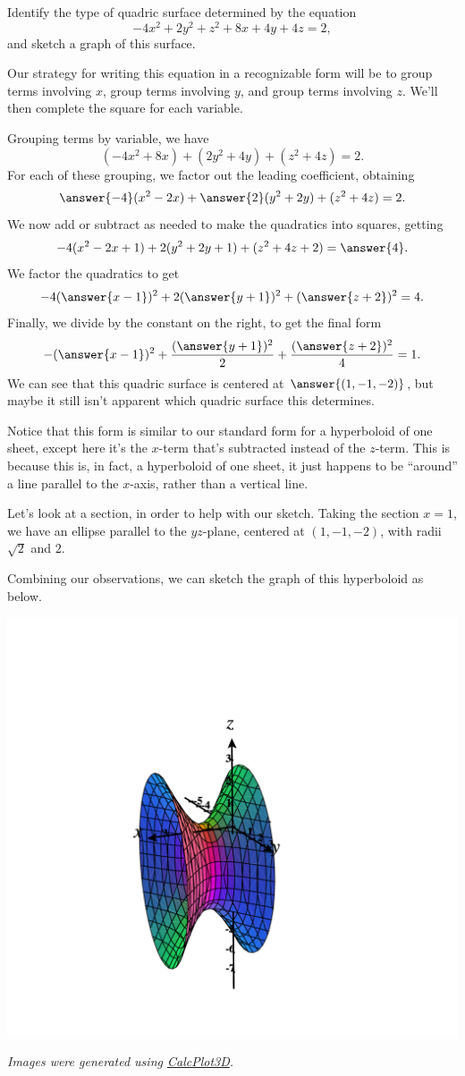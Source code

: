\documentclass{ximera}
\begin{document}
\begin{example}
Identify the type of quadric surface determined by the equation
\[
-4x^2 + 2y^2 + z^2 + 8x + 4y+4z = 2,
\]
and sketch a graph of this surface.

Our strategy for writing this equation in a recognizable form will be to group terms involving $x$, group terms involving $y$, and group terms involving $z$. We'll then complete the square for each variable.

Grouping terms by variable, we have
\[
(-4x^2+8x) + (2y^2 + 4y) + (z^2 + 4z) = 2.
\]
For each of these grouping, we factor out the leading coefficient, obtaining
\[
\answer{-4}(x^2-2x) + \answer{2}(y^2 + 2y) + (z^2 + 4z) = 2.
\]
We now add or subtract as needed to make the quadratics into squares, getting
\[
-4(x^2-2x + 1) + 2(y^2 + 2y + 1) + (z^2 + 4z + 2) = \answer{4}.
\]
We factor the quadratics to get
\[
-4(\answer{x-1})^2 + 2(\answer{y+1})^2 + (\answer{z+2})^2 = 4.
\]
Finally, we divide by the constant on the right, to get the final form
\[
-(\answer{x-1})^2 + \frac{(\answer{y+1})^2}{2} + \frac{(\answer{z+2})^2}{4} = 1.
\]
We can see that this quadric surface is centered at $\answer{(1,-1,-2)}$, but maybe it still isn't apparent which quadric surface this determines.

Notice that this form is similar to our standard form for a hyperboloid of one sheet, except here it's the $x$-term that's subtracted instead of the $z$-term. This is because this is, in fact, a hyperboloid of one sheet, it just happens to be ``around'' a line parallel to the $x$-axis, rather than a vertical line.

Let's look at a section, in order to help with our sketch. Taking the section $x = 1$, we have an ellipse parallel to the $yz$-plane, centered at $(1,-1,-2)$, with radii $\sqrt{2}$ and $2$.

Combining our observations, we can sketch the graph of this hyperboloid as below.

\begin{image}
\includegraphics[width = \textwidth]{CalcPlot3D-shifted_hyperboloid}
\end{image}
\end{example}

\textit{Images were generated using \href{https://www.monroecc.edu/faculty/paulseeburger/calcnsf/CalcPlot3D/}{CalcPlot3D}.}
\end{document}
